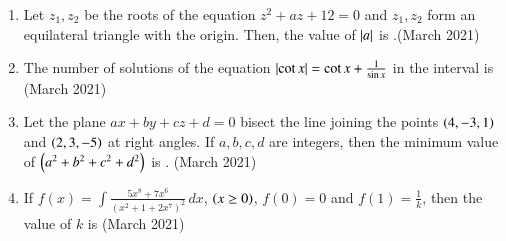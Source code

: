 \documentclass[journal,12pt,onecolumn]{IEEEtran}
\theoremstyle{remark}
\begin{document}
\begin{enumerate}
\begin{center}
   \end{center}   

\item Let $z_1, z_2$ be the roots of the equation $z^2 + az + 12 = 0$ and $z_1, z_2$ form an equilateral triangle with the origin. Then, the value of $\left\vert a\right\vert$ is \underline{\hspace{1cm}}.\hfill (March 2021)
\\

\item The number of solutions of the equation $\left\vert\cot x\right\vert  = \cot x + \frac{1}{\sin x}$ in the interval  is \underline{\hspace{1cm}}\hfill (March 2021)
\\

\item Let the plane $ax + by + cz + d = 0$ bisect the line joining the points $\left(4, -3, 1\right)$ and $\left(2, 3, -5\right)$ at right angles. If $a, b, c, d$ are integers, then the minimum value of $\left(a^2 + b^2 + c^2 + d^2\right)$ is \underline{\hspace{1cm}}. \hfill (March 2021)
\\
\item If $f(x) = \int \frac{5x^8 + 7x^6}{(x^2 + 1 + 2x^7)^2} \, dx$, $\left(x \geq 0\right)$, $f(0) = 0$ and $f(1) = \frac{1}{k}$, then the value of $k$ is \underline{\hspace{1cm}}\hfill (March 2021)




\end{enumerate}
\end{document}
